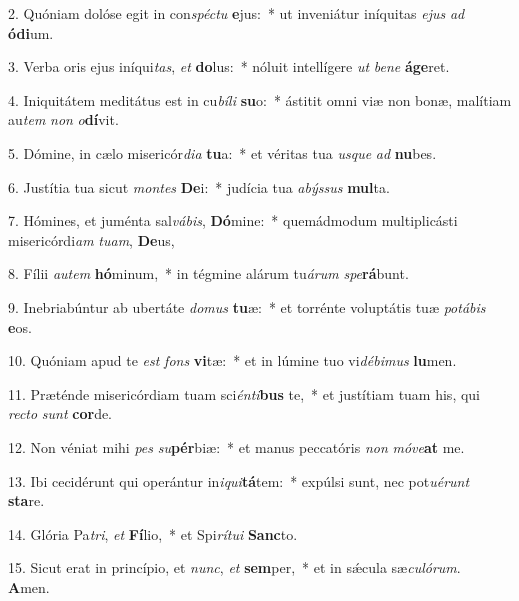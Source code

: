 2. Quóniam dolóse egit in con\textit{spéc}\textit{tu} \textbf{e}jus:~*  ut inveniátur iníquitas \textit{e}\textit{jus} \textit{ad} \textbf{ó}\textbf{di}um.\

3. Verba oris ejus iníqui\textit{tas}, \textit{et} \textbf{do}lus:~*  nóluit intellígere \textit{ut} \textit{be}\textit{ne} \textbf{á}\textbf{ge}ret.\

4. Iniquitátem meditátus est in cu\textit{bí}\textit{li} \textbf{su}o:~*  ástitit omni viæ non bonæ, malítiam au\textit{tem} \textit{non} \textit{o}\textbf{dí}vit.\

5. Dómine, in cælo misericór\textit{di}\textit{a} \textbf{tu}a:~*  et véritas tua \textit{us}\textit{que} \textit{ad} \textbf{nu}bes.\

6. Justítia tua sicut \textit{mon}\textit{tes} \textbf{De}i:~*  judícia tua \textit{a}\textit{býs}\textit{sus} \textbf{mul}ta.\

7. Hómines, et juménta sal\textit{vá}\textit{bis}, \textbf{Dó}mine:~*  quemádmodum multiplicásti misericórdi\textit{am} \textit{tu}\textit{am}, \textbf{De}us,\

8. Fílii \textit{au}\textit{tem} \textbf{hó}minum,~*  in tégmine alárum tu\textit{á}\textit{rum} \textit{spe}\textbf{rá}bunt.\

9. Inebriabúntur ab ubertáte \textit{do}\textit{mus} \textbf{tu}æ:~*  et torrénte voluptátis tuæ \textit{po}\textit{tá}\textit{bis} \textbf{e}os.\

10. Quóniam apud te \textit{est} \textit{fons} \textbf{vi}tæ:~*  et in lúmine tuo vi\textit{dé}\textit{bi}\textit{mus} \textbf{lu}men.\

11. Præténde misericórdiam tuam sci\textit{én}\textit{ti}\textbf{bus} te,~*  et justítiam tuam his, qui \textit{rec}\textit{to} \textit{sunt} \textbf{cor}de.\

12. Non véniat mihi \textit{pes} \textit{su}\textbf{pér}biæ:~*  et manus peccatóris \textit{non} \textit{mó}\textit{ve}\textbf{at} me.\

13. Ibi cecidérunt qui operántur in\textit{i}\textit{qui}\textbf{tá}tem:~*  expúlsi sunt, nec pot\textit{u}\textit{é}\textit{runt} \textbf{sta}re.\

14. Glória Pa\textit{tri}, \textit{et} \textbf{Fí}lio,~*  et Spi\textit{rí}\textit{tu}\textit{i} \textbf{Sanc}to.\

15. Sicut erat in princípio, et \textit{nunc}, \textit{et} \textbf{sem}per,~*  et in sǽcula sæ\textit{cu}\textit{ló}\textit{rum}. \textbf{A}men.\

